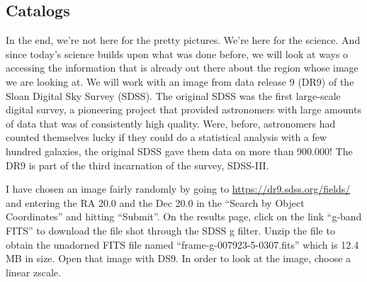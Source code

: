 \documentclass[twocolumn,apj]{openjournal}
\begin{document}
\subsection{Catalogs}
\label{DS9DR9}

In the end, we're not here for the pretty pictures. We're here for the science. And since today's science builds upon what was done before, we will look at ways o accessing the information that is already out there about the region whose image we are looking at. We will work with an image from data release 9 (DR9) of the Sloan Digital Sky Survey (SDSS). The original SDSS was the first large-scale digital survey, a pioneering project that provided astronomers with large amounts of data that was of consistently high quality. Were, before, astronomers had counted themselves lucky if they could do a statistical analysis with a few hundred galaxies, the original SDSS gave them data on more than 900.000! The DR9 is part of the third incarnation of the survey, SDSS-III.

I have chosen an image fairly randomly by going to \href{https://dr9.sdss.org/fields/}{https://dr9.sdss.org/fields/} and entering the RA 20.0 and the Dec 20.0 in the ``Search by Object Coordinates'' and hitting ``Submit''. On the results page, click on the link ``g-band FITS'' to download the file shot through the SDSS g filter. Unzip the file to obtain the unadorned FITS file named ``frame-g-007923-5-0307.fits'' which is 12.4 MB in size. Open that image with DS9.  In order to look at the image, choose a linear zscale.
\end{document}
